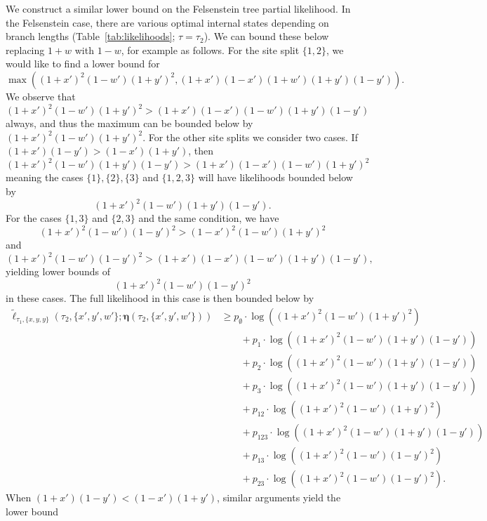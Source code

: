 \documentclass{article}
\newcommand{\fullAncestralSplitPartitions}{\boldsymbol\eta}
\begin{document}
We construct a similar lower bound on the Felsenstein tree partial likelihood.
In the Felsenstein case, there are various optimal internal states depending on branch lengths (Table~\ref{tab:likelihoods}; $\tau = \tau_2$).
We can bound these below replacing $1+w$ with $1-w$, for example as follows.
For the site split $\{1,2\}$, we would like to find a lower bound for
$$
\max\left((1+x')^2 (1-w')(1+y')^2, (1+x')(1-x')(1+w')(1+y')(1-y')\right).
$$
We observe that
$$
(1+x')^2 (1-w')(1+y')^2 > (1+x')(1-x')(1-w')(1+y')(1-y')
$$
always, and thus the maximum can be bounded below by $(1+x')^2 (1-w')(1+y')^2$.
For the other site splits we consider two cases.
If $(1+x')(1-y') > (1-x')(1+y')$, then
$$
(1+x')^2(1-w')(1+y')(1-y') > (1+x')(1-x')(1-w')(1+y')^2
$$
meaning the cases $\{1\}, \{2\}, \{3\}$ and $\{1,2,3\}$ will have likelihoods bounded below by
$$
(1+x')^2(1-w')(1+y')(1-y').
$$
For the cases $\{1,3\}$ and $\{2,3\}$ and the same condition, we have
$$
(1+x')^2(1-w')(1-y')^2 > (1-x')^2(1-w')(1+y')^2
$$
and
$$
(1+x')^2(1-w')(1-y')^2 > (1+x')(1-x')(1-w')(1+y')(1-y'),
$$
yielding lower bounds of
$$
(1+x')^2(1-w')(1-y')^2
$$
in these cases.
The full likelihood in this case is then bounded below by
\begin{align*}
    \tilde{\ell}_{\tau_1,\{x,y,y\}}(\tau_2, \{x',y',w'\}; \fullAncestralSplitPartitions(\tau_2,\{x',y',w'\}))
    &\ge      p_{\emptyset}  \cdot\log((1+x')^2   (1-w')(1+y')^2) \\
    &\qquad + p_{1}          \cdot\log((1+x')^2   (1-w')(1+y')(1-y')) \\
    &\qquad + p_{2}          \cdot\log((1+x')^2   (1-w')(1+y')(1-y')) \\
    &\qquad + p_{3}          \cdot\log((1+x')^2   (1-w')(1+y')(1-y')) \\
    &\qquad + p_{12}         \cdot\log((1+x')^2   (1-w')(1+y')^2) \\
    &\qquad + p_{123}        \cdot\log((1+x')^2   (1-w')(1+y')(1-y'))\\
    &\qquad + p_{13}         \cdot\log((1+x')^2   (1-w')(1-y')^2) \\
    &\qquad + p_{23}         \cdot\log((1+x')^2   (1-w')(1-y')^2).
\end{align*}
When $(1+x')(1-y') < (1-x')(1+y')$, similar arguments yield the lower bound
\end{document}
